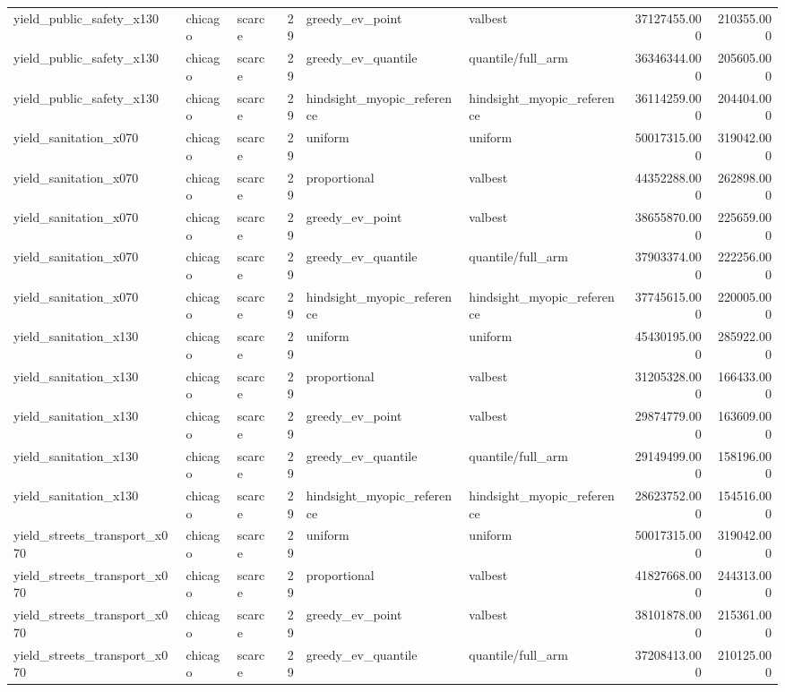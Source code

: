 \begin{tabular}{lllrllrr}
yield\_public\_safety\_x130 & chicago & scarce & 29 & greedy\_ev\_point & valbest & 37127455.000 & 210355.000 \\
yield\_public\_safety\_x130 & chicago & scarce & 29 & greedy\_ev\_quantile & quantile/full\_arm & 36346344.000 & 205605.000 \\
yield\_public\_safety\_x130 & chicago & scarce & 29 & hindsight\_myopic\_reference & hindsight\_myopic\_reference & 36114259.000 & 204404.000 \\
yield\_sanitation\_x070 & chicago & scarce & 29 & uniform & uniform & 50017315.000 & 319042.000 \\
yield\_sanitation\_x070 & chicago & scarce & 29 & proportional & valbest & 44352288.000 & 262898.000 \\
yield\_sanitation\_x070 & chicago & scarce & 29 & greedy\_ev\_point & valbest & 38655870.000 & 225659.000 \\
yield\_sanitation\_x070 & chicago & scarce & 29 & greedy\_ev\_quantile & quantile/full\_arm & 37903374.000 & 222256.000 \\
yield\_sanitation\_x070 & chicago & scarce & 29 & hindsight\_myopic\_reference & hindsight\_myopic\_reference & 37745615.000 & 220005.000 \\
yield\_sanitation\_x130 & chicago & scarce & 29 & uniform & uniform & 45430195.000 & 285922.000 \\
yield\_sanitation\_x130 & chicago & scarce & 29 & proportional & valbest & 31205328.000 & 166433.000 \\
yield\_sanitation\_x130 & chicago & scarce & 29 & greedy\_ev\_point & valbest & 29874779.000 & 163609.000 \\
yield\_sanitation\_x130 & chicago & scarce & 29 & greedy\_ev\_quantile & quantile/full\_arm & 29149499.000 & 158196.000 \\
yield\_sanitation\_x130 & chicago & scarce & 29 & hindsight\_myopic\_reference & hindsight\_myopic\_reference & 28623752.000 & 154516.000 \\
yield\_streets\_transport\_x070 & chicago & scarce & 29 & uniform & uniform & 50017315.000 & 319042.000 \\
yield\_streets\_transport\_x070 & chicago & scarce & 29 & proportional & valbest & 41827668.000 & 244313.000 \\
yield\_streets\_transport\_x070 & chicago & scarce & 29 & greedy\_ev\_point & valbest & 38101878.000 & 215361.000 \\
yield\_streets\_transport\_x070 & chicago & scarce & 29 & greedy\_ev\_quantile & quantile/full\_arm & 37208413.000 & 210125.000 \\

\end{tabular}
